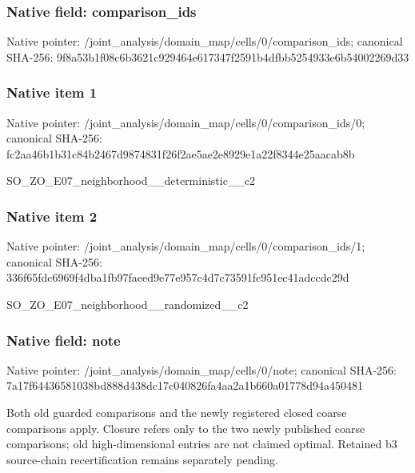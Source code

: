 \documentclass[10pt,a4paper]{article}
\begin{document}
\subsubsection{Native field: comparison\_\allowbreak{}ids}
Native pointer: /joint\_\allowbreak{}analysis/domain\_\allowbreak{}map/cells/0/comparison\_\allowbreak{}ids; canonical SHA-256: 9f8a53b1f08c6b3621c929464e617347f2591b4dfbb5254933e6b54002269d33

\subsubsection{Native item 1}
Native pointer: /joint\_\allowbreak{}analysis/domain\_\allowbreak{}map/cells/0/comparison\_\allowbreak{}ids/0; canonical SHA-256: fc2aa46b1b31c84b2467d9874831f26f2ae5ae2e8929e1a22f8344e25aacab8b

\begingroup\raggedright\sloppy SO\_\allowbreak{}ZO\_\allowbreak{}E07\_\allowbreak{}neighborhood\_\allowbreak{}\_\allowbreak{}deterministic\_\allowbreak{}\_\allowbreak{}c2\par\endgroup

\subsubsection{Native item 2}
Native pointer: /joint\_\allowbreak{}analysis/domain\_\allowbreak{}map/cells/0/comparison\_\allowbreak{}ids/1; canonical SHA-256: 336f65fdc6969f4dba1fb97faeed9e77e957c4d7c73591fc951ec41adccdc29d

\begingroup\raggedright\sloppy SO\_\allowbreak{}ZO\_\allowbreak{}E07\_\allowbreak{}neighborhood\_\allowbreak{}\_\allowbreak{}randomized\_\allowbreak{}\_\allowbreak{}c2\par\endgroup

\subsubsection{Native field: note}
Native pointer: /joint\_\allowbreak{}analysis/domain\_\allowbreak{}map/cells/0/note; canonical SHA-256: 7a17f64436581038bd888d438dc17c040826fa4aa2a1b660a01778d94a450481

\begingroup\raggedright\sloppy Both old guarded comparisons and the newly registered closed coarse comparisons apply. Closure refers only to the two newly published coarse comparisons;\allowbreak{} old high-dimensional entries are not claimed optimal. Retained b3 source-chain recertification remains separately pending.\par\endgroup
\end{document}

